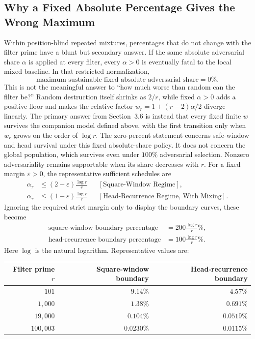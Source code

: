 \subsection{Why a Fixed Absolute Percentage Gives the Wrong Maximum}
Within position-blind repeated mixtures, percentages that do not change with the filter prime have a blunt but secondary answer. If the same absolute adversarial share $\alpha$ is applied at every filter, every $\alpha > 0$ is eventually fatal to the local mixed baseline. In that restricted normalization,
\begin{equation*}
\text{maximum sustainable fixed absolute adversarial share}=0\%.
\end{equation*}
This is not the meaningful answer to “how much worse than random can the filter be?” Random destruction itself shrinks as $2/r$, while fixed $\alpha > 0$ adds a positive floor and makes the relative factor $w_r=1+(r-2)\alpha/2$ diverge linearly. The primary answer from Section~3.6 is instead that every fixed finite $w$ survives the companion model defined above, with the first transition only when $w_r$ grows on the order of $\log r$.
The zero-percent statement concerns safe-window and head survival under this fixed absolute-share policy. It does not concern the global population, which survives even under $100\%$ adversarial selection.
Nonzero adversariality remains supportable when its share decreases with $r$. For a fixed margin $\varepsilon > 0$, the representative sufficient schedules are
\begin{equation*}
\begin{aligned}
\alpha_r
&\le(2-\varepsilon)\frac{\log r}{r}
&&[\text{Square-Window Regime}],\\
\alpha_r
&\le(1-\varepsilon)\frac{\log r}{r}
&&[\text{Head-Recurrence Regime, With Mixing}].
\end{aligned}
\end{equation*}
Ignoring the required strict margin only to display the boundary curves, these become
\begin{equation*}
\begin{aligned}
\text{square-window boundary percentage}
&=200\frac{\log r}{r}\%,\\
\text{head-recurrence boundary percentage}
&=100\frac{\log r}{r}\%.
\end{aligned}
\end{equation*}
Here $\log$ is the natural logarithm. Representative values are:
\begin{longtable}{rrr}
\toprule
Filter prime $r$ & Square-window boundary & Head-recurrence boundary \\
\midrule
$101$ & $9.14\%$ & $4.57\%$ \\
$1{,}000$ & $1.38\%$ & $0.691\%$ \\
$19{,}000$ & $0.104\%$ & $0.0519\%$ \\
$100{,}003$ & $0.0230\%$ & $0.0115\%$ \\
\bottomrule
\end{longtable}
